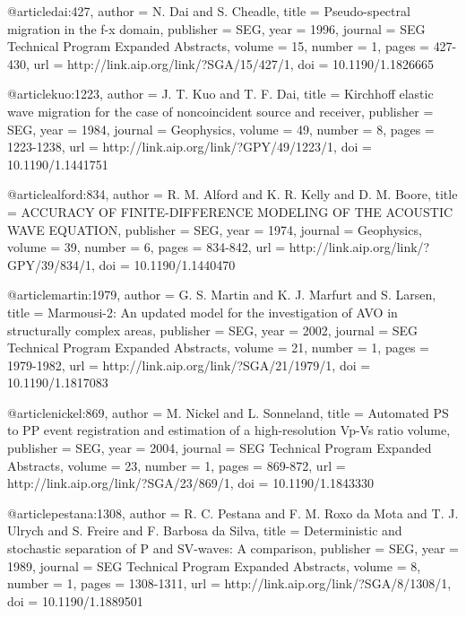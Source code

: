 @article{dai:427,
  author =	 {N. Dai and S. Cheadle},
  title =	 {Pseudo-spectral migration in the f-x domain},
  publisher =	 {SEG},
  year =	 1996,
  journal =	 {SEG Technical Program Expanded Abstracts},
  volume =	 15,
  number =	 1,
  pages =	 {427-430},
  url =		 {http://link.aip.org/link/?SGA/15/427/1},
  doi =		 {10.1190/1.1826665}
}

@article{kuo:1223,
  author =	 {J. T. Kuo and T. F. Dai},
  title =	 {Kirchhoff elastic wave migration for the case of
                  noncoincident source and receiver},
  publisher =	 {SEG},
  year =	 1984,
  journal =	 {Geophysics},
  volume =	 49,
  number =	 8,
  pages =	 {1223-1238},
  url =		 {http://link.aip.org/link/?GPY/49/1223/1},
  doi =		 {10.1190/1.1441751}
}

@article{alford:834,
  author =	 {R. M. Alford and K. R. Kelly and D. M. Boore},
  title =	 {ACCURACY OF FINITE-DIFFERENCE MODELING OF THE
                  ACOUSTIC WAVE EQUATION},
  publisher =	 {SEG},
  year =	 1974,
  journal =	 {Geophysics},
  volume =	 39,
  number =	 6,
  pages =	 {834-842},
  url =		 {http://link.aip.org/link/?GPY/39/834/1},
  doi =		 {10.1190/1.1440470}
}

@article{martin:1979,
  author =	 {G. S. Martin and K. J. Marfurt and S. Larsen},
  title =	 {Marmousi-2: An updated model for the investigation
                  of AVO in structurally complex areas},
  publisher =	 {SEG},
  year =	 2002,
  journal =	 {SEG Technical Program Expanded Abstracts},
  volume =	 21,
  number =	 1,
  pages =	 {1979-1982},
  url =		 {http://link.aip.org/link/?SGA/21/1979/1},
  doi =		 {10.1190/1.1817083}
}

@article{nickel:869,
  author =	 {M. Nickel and L. Sonneland},
  title =	 {Automated {PS} to {PP} event registration and
                  estimation of a high-resolution {V}p-{V}s ratio
                  volume},
  publisher =	 {SEG},
  year =	 2004,
  journal =	 {SEG Technical Program Expanded Abstracts},
  volume =	 23,
  number =	 1,
  pages =	 {869-872},
  url =		 {http://link.aip.org/link/?SGA/23/869/1},
  doi =		 {10.1190/1.1843330}
}

@article{pestana:1308,
  author =	 {R. C. Pestana and F. M. Roxo da Mota and
                  T. J. Ulrych and S. Freire and F. Barbosa
                  da Silva},
  title =	 {Deterministic and stochastic separation of {P} and
                  {SV}-waves: A comparison},
  publisher =	 {SEG},
  year =	 1989,
  journal =	 {SEG Technical Program Expanded Abstracts},
  volume =	 8,
  number =	 1,
  pages =	 {1308-1311},
  url =		 {http://link.aip.org/link/?SGA/8/1308/1},
  doi =		 {10.1190/1.1889501}
}

